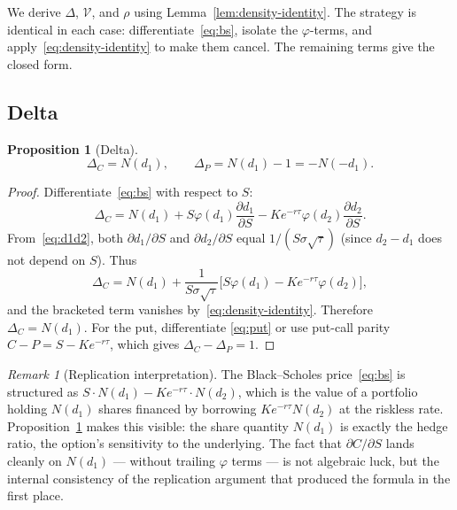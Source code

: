 \documentclass[11pt,a4paper]{article}
\theoremstyle{plain}
\newtheorem{proposition}[theorem]{Proposition}
\theoremstyle{definition}
\theoremstyle{remark}
\newtheorem{remark}[theorem]{Remark}
\newcommand{\Vega}{\mathcal{V}}
\begin{document}
We derive \(\Delta\), \(\Vega\), and \(\rho\) using
Lemma~\ref{lem:density-identity}. The strategy is identical in each
case: differentiate~\eqref{eq:bs}, isolate the
\(\varphi\)-terms, and apply~\eqref{eq:density-identity} to make them
cancel. The remaining terms give the closed form.

\subsection{Delta}

\begin{proposition}[Delta]
\label{prop:delta}
\[
    \Delta_C = N(d_1), \qquad \Delta_P = N(d_1) - 1 = -N(-d_1).
\]
\end{proposition}

\begin{proof}
Differentiate~\eqref{eq:bs} with respect to \(S\):
\[
    \Delta_C = N(d_1) + S \varphi(d_1) \frac{\partial d_1}{\partial S}
              - K e^{-r\tau} \varphi(d_2) \frac{\partial d_2}{\partial S}.
\]
From~\eqref{eq:d1d2}, both \(\partial d_1 / \partial S\) and
\(\partial d_2 / \partial S\) equal \(1 / (S \sigma \sqrt{\tau})\)
(since \(d_2 - d_1\) does not depend on \(S\)). Thus
\[
    \Delta_C = N(d_1) + \frac{1}{S \sigma \sqrt{\tau}}
        \bigl[S \varphi(d_1) - K e^{-r\tau} \varphi(d_2)\bigr],
\]
and the bracketed term vanishes by~\eqref{eq:density-identity}.
Therefore \(\Delta_C = N(d_1)\). For the put, differentiate
\eqref{eq:put} or use put-call parity \(C - P = S - Ke^{-r\tau}\),
which gives \(\Delta_C - \Delta_P = 1\).
\end{proof}

\begin{remark}[Replication interpretation]
The Black--Scholes price~\eqref{eq:bs} is structured as
\(S \cdot N(d_1) - K e^{-r\tau} \cdot N(d_2)\), which is the value of
a portfolio holding \(N(d_1)\) shares financed by borrowing
\(K e^{-r\tau} N(d_2)\) at the riskless rate. Proposition~\ref{prop:delta}
makes this visible: the share quantity \(N(d_1)\) is exactly the
hedge ratio, the option's sensitivity to the underlying. The fact
that \(\partial C/\partial S\) lands cleanly on \(N(d_1)\) ---
without trailing \(\varphi\) terms --- is not algebraic luck, but the
internal consistency of the replication argument that produced the
formula in the first place.
\end{remark}
\end{document}
